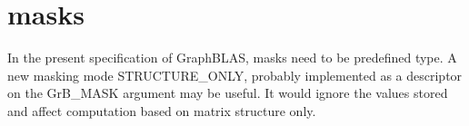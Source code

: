 \section{masks}
\label{Sec:Masks}

 In the present specification of GraphBLAS, masks need to be predefined type. A new masking mode {\sf STRUCTURE\_ONLY}, probably implemented as a descriptor on the {\sf GrB\_MASK} argument may be useful. It would ignore the values stored and affect computation based on matrix structure only.
 
